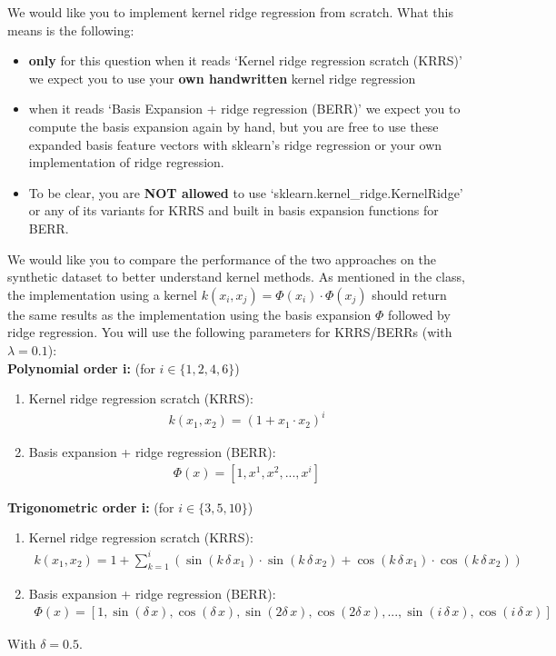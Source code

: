 \documentclass[11pt]{article}
\begin{document}
\begin{problem}{75}
\begin{description}
We would like you to implement kernel ridge regression from scratch. What this means is the following:

\begin{itemize}
	\item  \textbf{only} for this question when it reads `Kernel ridge regression scratch (KRRS)' we expect you to use your \textbf{own handwritten} kernel ridge regression
	\item when it reads `Basis Expansion + ridge regression (BERR)' we expect you to compute the basis expansion again by hand, but you are free to use these expanded basis feature vectors with sklearn's ridge regression or your own implementation of ridge regression.
	\item To be clear, you are \textbf{NOT allowed} to use `sklearn.kernel\_ridge.KernelRidge' or any of its variants for KRRS and built in basis expansion functions for BERR.
\end{itemize}

We would like you to compare the performance of the two approaches on the synthetic dataset to better understand kernel methods. As mentioned in the class, the implementation using a kernel $k(x_i, x_j) = \Phi(x_i) \cdot \Phi(x_j)$ should return the same results as the implementation using the basis expansion $\Phi$ followed by ridge regression. You will use the following parameters for KRRS/BERRs (with $\lambda = 0.1$):\\

\textbf{Polynomial order i:} (for $i \in \{1,2,4,6\}$)\\
\begin{enumerate}
\item Kernel ridge regression scratch (KRRS):
\begin{align}
k(x_1, x_2) = (1 + x_1 \cdot x_2) ^ i
\end{align}
\item Basis expansion + ridge regression (BERR):
\begin{align}
\Phi(x) = [1, x^1, x^2, ..., x^i]
\end{align}
\end{enumerate}
\textbf{Trigonometric order i:} (for $i \in \{3, 5, 10\}$)\\
\begin{enumerate}
\item Kernel ridge regression scratch (KRRS):
\begin{align}
k(x_1, x_2) = 1 + \sum_{k = 1}^{i} (\sin(k\,\delta \, x_1) \cdot \sin(k\,\delta \, x_2) + \cos(k\,\delta \, x_1) \cdot \cos(k\,\delta \, x_2) )
\end{align}
\item Basis expansion + ridge regression (BERR):
\begin{align}
\Phi(x) = [1, \sin(\delta \, x), \cos(\delta \, x), \sin(2\delta \, x), \cos(2\delta \, x), ..., \sin(i \,\delta \, x), \cos(i \,\delta \, x)]
\end{align}
\end{enumerate}
With $\delta = 0.5$.\\


\end{description}
\end{problem}
\end{document}
